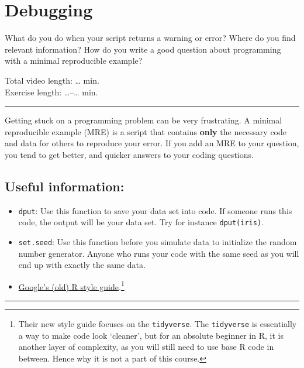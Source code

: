 \documentclass[
]{book}
\providecommand{\tightlist}{%
  \setlength{\itemsep}{0pt}\setlength{\parskip}{0pt}}
\begin{document}
\hypertarget{MWE}{%
\chapter{Debugging}\label{MWE}}

What do you do when your script returns a warning or error? Where do you find relevant information? How do you write a good question about programming with a minimal reproducible example?

Total video length: \ldots{} min.\\
Exercise length: \ldots--\ldots{} min.

\begin{center}\rule{0.5\linewidth}{0.5pt}\end{center}

Getting stuck on a programming problem can be very frustrating. A minimal reproducible example (MRE) is a script that contains \textbf{only} the necessary code and data for others to reproduce your error. If you add an MRE to your question, you tend to get better, and quicker answers to your coding questions.

\hypertarget{useful-information}{%
\section{Useful information:}\label{useful-information}}

\begin{itemize}
\tightlist
\item
  \texttt{dput}: Use this function to save your data set into code. If someone runs this code, the output will be your data set. Try for instance \texttt{dput(iris)}.
\item
  \texttt{set.seed}: Use this function before you simulate data to initialize the random number generator. Anyone who runs your code with the same seed as you will end up with exactly the same data.
\item
  \href{http://web.stanford.edu/class/cs109l/unrestricted/resources/google-style.html}{Google's (old) R style guide}.\footnote{Their new style guide focuses on the \texttt{tidyverse}. The \texttt{tidyverse} is essentially a way to make code look `cleaner', but for an absolute beginner in R, it is another layer of complexity, as you will still need to use base R code in between. Hence why it is not a part of this course.}
\end{itemize}

\begin{center}\rule{0.5\linewidth}{0.5pt}\end{center}
\end{document}
